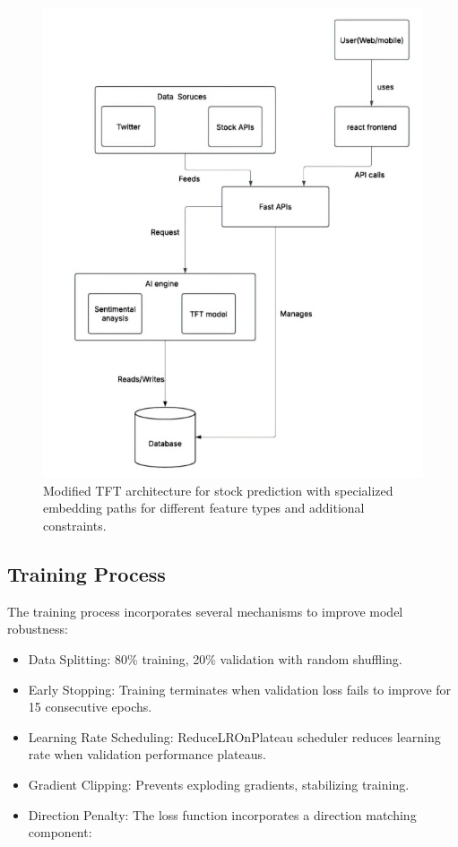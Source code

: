 \documentclass[conference]{IEEEtran}
\begin{document}
\begin{figure}[h]
\centering
\includegraphics[width=0.9\linewidth]{tft_architecture.jpeg}
\caption{Modified TFT architecture for stock prediction with specialized embedding paths for different feature types and additional constraints.}
\label{fig:tft_architecture}
\end{figure}

\subsection{Training Process}
The training process incorporates several mechanisms to improve model robustness:

\begin{itemize}
\item Data Splitting: 80\% training, 20\% validation with random shuffling.
\item Early Stopping: Training terminates when validation loss fails to improve for 15 consecutive epochs.
\item Learning Rate Scheduling: ReduceLROnPlateau scheduler reduces learning rate when validation performance plateaus.
\item Gradient Clipping: Prevents exploding gradients, stabilizing training.
\item Direction Penalty: The loss function incorporates a direction matching component:
\end{itemize}
\end{document}
